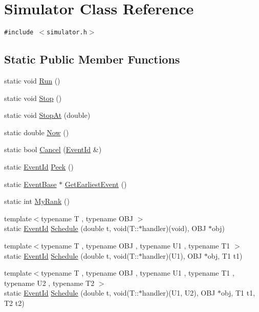 \hypertarget{classSimulator}{
\section{Simulator Class Reference}
\label{classSimulator}
}
{\tt \#include $<$simulator.h$>$}

\subsection*{Static Public Member Functions}
\begin{CompactItemize}
\item 
static void \hyperlink{classSimulator_27e7045e7aa4e29e9d2003aaa09c8326}{Run} ()
\item 
static void \hyperlink{classSimulator_d493423e80256f53c715bb59c16ec78e}{Stop} ()
\item 
static void \hyperlink{classSimulator_5611e1169517890edfeeb33f91281dd8}{StopAt} (double)
\item 
static double \hyperlink{classSimulator_cf5727f517db6743ddf25ae7cc9a8db4}{Now} ()
\item 
static bool \hyperlink{classSimulator_f85320c35a3ef59e17244e53047a4501}{Cancel} (\hyperlink{classEventId}{EventId} \&)
\item 
static \hyperlink{classEventId}{EventId} \hyperlink{classSimulator_b70ac4a1b36c3a20e7548203d22b9c17}{Peek} ()
\item 
static \hyperlink{classEventBase}{EventBase} $\ast$ \hyperlink{classSimulator_766aee01e48e500f84af435626ab7004}{GetEarliestEvent} ()
\item 
static int \hyperlink{classSimulator_80bffbd51839958866ddd16fde614ecf}{MyRank} ()
\item 
{\footnotesize template$<$typename T , typename OBJ $>$ }\\static \hyperlink{classEventId}{EventId} \hyperlink{classSimulator_2b4be0a76ed9915d4c1c861386d666bc}{Schedule} (double t, void(T::$\ast$handler)(void), OBJ $\ast$obj)
\item 
{\footnotesize template$<$typename T , typename OBJ , typename U1 , typename T1 $>$ }\\static \hyperlink{classEventId}{EventId} \hyperlink{classSimulator_f483426f923de97d0f71ff88beceedbe}{Schedule} (double t, void(T::$\ast$handler)(U1), OBJ $\ast$obj, T1 t1)
\item 
{\footnotesize template$<$typename T , typename OBJ , typename U1 , typename T1 , typename U2 , typename T2 $>$ }\\static \hyperlink{classEventId}{EventId} \hyperlink{classSimulator_bb9b661fcd4fcbb62c331ef07a53eb7d}{Schedule} (double t, void(T::$\ast$handler)(U1, U2), OBJ $\ast$obj, T1 t1, T2 t2)

\end{CompactItemize}
